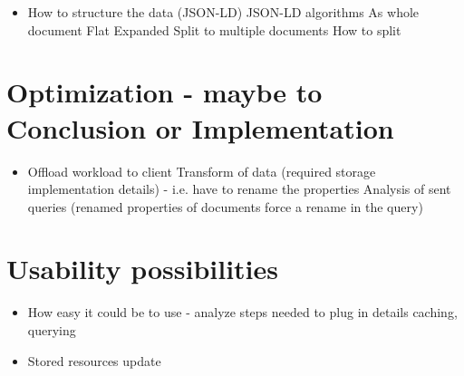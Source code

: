 \begin{itemize}
	\item How to structure the data (JSON-LD)
		\subitem JSON-LD algorithms
		\subitem As whole document
			\subsubitem Flat
			\subsubitem Expanded
		\subitem Split to multiple documents
			\subsubitem How to split
\end{itemize}


\section{Optimization - maybe to Conclusion or Implementation}
\begin{itemize}
	\item Offload workload to client
		\subitem Transform of data (required storage implementation details) - i.e. have to rename the properties
		\subitem Analysis of sent queries (renamed properties of documents force a rename in the query)
\end{itemize}

\section{Usability possibilities}
\begin{itemize}
	\item How easy it could be to use - analyze steps needed to plug in details caching, querying
	\item Stored resources update
\end{itemize}